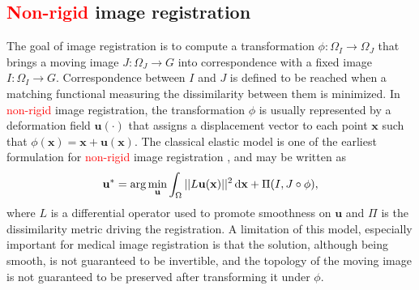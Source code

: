 \subsection{\textcolor{red}{Non-rigid} image registration}\label{sec:non_linear_image_registration}
The goal of image registration is to compute a transformation $\phi: \Omega_{I} \rightarrow \Omega_{J}$ that brings a moving image $J:\Omega_{J} \rightarrow G$ into correspondence
with a fixed image $I:\Omega_{I} \rightarrow G$. Correspondence between $I$ and $J$ is defined to be reached when a matching functional measuring the dissimilarity between them is minimized. In \textcolor{red}{non-rigid} image registration, the transformation $\phi$ is usually represented by a deformation field $\mathbf{u(\cdot)}$ that assigns a displacement vector
to each point $\mathbf{x}$ such that $\phi(\mathbf{x}) = \mathbf{x} + \mathbf{u}(\mathbf{x})$. The classical elastic model is one of the earliest formulation for \textcolor{red}{non-rigid} image registration \cite{Bajcsy1982, Gee1999}, and may be written as
\begin{equation}\label{eq:elastic}
    \mathbf{u}^{*} = \arg \min_{\mathbf{u}} \int_{\Omega} ||L \mathbf{u}(\mathbf{x})||^{2}\dif\mathbf{x} + \Pi(I, J \circ \phi),
\end{equation}
where $L$ is a differential operator used to promote smoothness on $\mathbf{u}$ and $\Pi$ is the dissimilarity metric driving the registration. A limitation of this model, especially important for medical image registration is that the solution, although being smooth, is not guaranteed to be invertible, and the topology of the moving image is not guaranteed to be preserved after transforming it under $\phi$.\\

